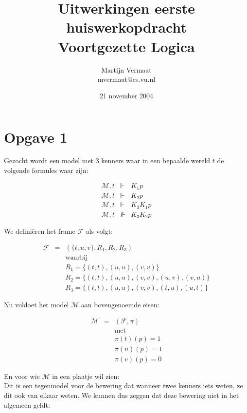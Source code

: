 \documentclass[a4paper,11pt]{article}
\title{Uitwerkingen eerste huiswerkopdracht\\Voortgezette Logica}
\author{
    Martijn Vermaat\\
    mvermaat@cs.vu.nl
}
\date{21 november 2004}
\begin{document}
\maketitle


\section*{Opgave 1}

Gezocht wordt een model met 3 kenners waar in een bepaalde wereld
$t$ de volgende formules waar zijn:

\begin{eqnarray*}
\mathcal{M},t & \Vdash & K_{1} p        \\
\mathcal{M},t & \Vdash & K_{2} p        \\
\mathcal{M},t & \Vdash & K_{3} K_{1} p  \\
\mathcal{M},t & \nVdash & K_{3} K_{2} p
\end{eqnarray*}

We defini\"eren het frame $\mathcal{F}$ als volgt:

\begin{eqnarray*}
\mathcal{F} & = & (\{t,u,v\}, R_{1}, R_{2}, R_{3}) \\
& & \mbox{waarbij}                                 \\
& & R_{1} = \{(t,t), (u,u), (v,v)\}                \\
& & R_{2} = \{(t,t), (u,u), (v,v), (u,v), (v,u)\}  \\
& & R_{3} = \{(t,t), (u,u), (v,v), (t,u), (u,t)\}
\end{eqnarray*}

Nu voldoet het model $\mathcal{M}$ aan bovengenoemde eisen:

\begin{eqnarray*}
\mathcal{M} & = & (\mathcal{F}, \pi) \\
& & \mbox{met}                       \\
& & \pi(t)(p) = 1                    \\
& & \pi(u)(p) = 1                    \\
& & \pi(v)(p) = 0
\end{eqnarray*}

En voor wie $\mathcal{M}$ in een plaatje wil zien:\\[1em]



Dit is een tegenmodel voor de bewering dat wanneer twee kenners iets
weten, ze dit ook van elkaar weten. We kunnen dus zeggen dat deze
bewering niet in het algemeen geldt:
\end{document}
